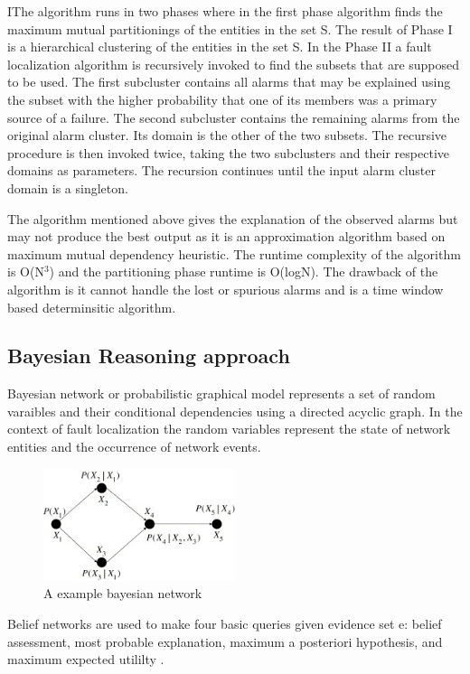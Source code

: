 \documentclass[10pt]{sigplan-proc-varsize}
\begin{document}
IThe algorithm runs in two phases where in the first phase algorithm finds the maximum mutual partitionings of the entities in the set S. The result of Phase I is a hierarchical clustering of the entities in the set S. In the Phase II a fault localization algorithm is recursively invoked to find the subsets that are supposed to be used. The first subcluster contains all alarms that may be explained using the subset with the higher probability that one of its members was a primary source of a failure. The second subcluster contains the remaining alarms from the original alarm cluster. Its domain is the other of the two subsets. The recursive procedure is then invoked twice, taking the two subclusters and their respective domains as parameters. The recursion continues until the input alarm cluster domain is a singleton. 

The algorithm mentioned above gives the explanation of the observed alarms but may not produce the best output as it is an approximation algorithm based on maximum mutual dependency heuristic. The runtime complexity of the algorithm is O(N$^{3}$) and the partitioning phase runtime is O(logN). The drawback of the algorithm is it cannot handle the lost or spurious alarms and is a time window based determinsitic algorithm.

\subsection{Bayesian Reasoning approach}
Bayesian network or probabilistic graphical model represents a set of random varaibles and their conditional dependencies using a directed acyclic graph. In the context of fault localization the random variables represent the state of network entities and the occurrence of network events. 

\begin{figure}[h!]
  \caption{A example bayesian network}
  \centering
    \includegraphics[width=0.5\textwidth]{Fig6}
\end{figure}

Belief networks are used to make four basic queries given evidence set e: belief assessment, most probable explanation, maximum a posteriori hypothesis, and maximum expected utililty \cite{Pearl:98}.
\end{document}

